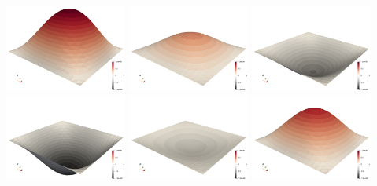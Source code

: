 \begin{center}
\includegraphics[width=4cm]{python_codes/fieldstone_165/results1/uuu0000.png}
\includegraphics[width=4cm]{python_codes/fieldstone_165/results1/uuu0050.png}
\includegraphics[width=4cm]{python_codes/fieldstone_165/results1/uuu0100.png}\\
\includegraphics[width=4cm]{python_codes/fieldstone_165/results1/uuu0150.png}
\includegraphics[width=4cm]{python_codes/fieldstone_165/results1/uuu0200.png}
\includegraphics[width=4cm]{python_codes/fieldstone_165/results1/uuu0249.png}
\end{center}







